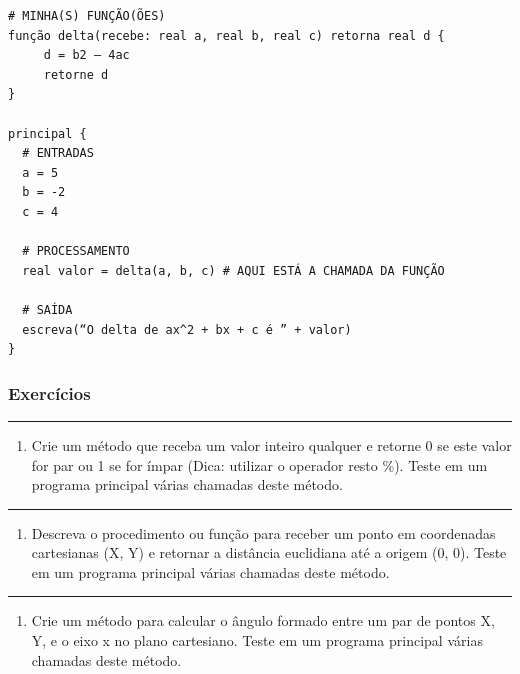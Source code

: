 \documentclass[12pt,a4paper]{article}
\renewcommand{\linethickness}{0.05em}
\providecommand{\tightlist}{%
      \setlength{\itemsep}{0pt}\setlength{\parskip}{0pt}}
\begin{document}
    \begin{verbatim}
# MINHA(S) FUNÇÃO(ÕES)
função delta(recebe: real a, real b, real c) retorna real d {
     d = b2 – 4ac
     retorne d
}

principal {
  # ENTRADAS
  a = 5
  b = -2
  c = 4

  # PROCESSAMENTO
  real valor = delta(a, b, c) # AQUI ESTÁ A CHAMADA DA FUNÇÃO
  
  # SAÍDA
  escreva(“O delta de ax^2 + bx + c é ” + valor)
}
\end{verbatim}

    \hypertarget{exercuxedcios}{%
\subsubsection{Exercícios}\label{exercuxedcios}}

    \begin{center}\rule{0.5\linewidth}{\linethickness}\end{center}

\begin{enumerate}
\def\labelenumi{\arabic{enumi}.}
\tightlist
\item
  Crie um método que receba um valor inteiro qualquer e retorne 0 se
  este valor for par ou 1 se for ímpar (Dica: utilizar o operador resto
  \%). Teste em um programa principal várias chamadas deste método.
\end{enumerate}

    \begin{center}\rule{0.5\linewidth}{\linethickness}\end{center}

\begin{enumerate}
\def\labelenumi{\arabic{enumi}.}
\setcounter{enumi}{1}
\tightlist
\item
  Descreva o procedimento ou função para receber um ponto em coordenadas
  cartesianas (X, Y) e retornar a distância euclidiana até a origem (0,
  0). Teste em um programa principal várias chamadas deste método.
\end{enumerate}

    \begin{center}\rule{0.5\linewidth}{\linethickness}\end{center}

\begin{enumerate}
\def\labelenumi{\arabic{enumi}.}
\setcounter{enumi}{2}
\tightlist
\item
  Crie um método para calcular o ângulo formado entre um par de pontos
  X, Y, e o eixo x no plano cartesiano. Teste em um programa principal
  várias chamadas deste método.
\end{enumerate}
\end{document}
